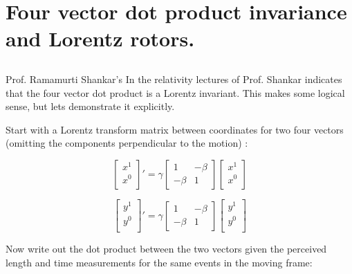 \chapter{Four vector dot product invariance and Lorentz rotors.}
\date{August 1, 2008}        %
\section{}

Prof. Ramamurti Shankar's 
In the relativity lectures of
\cite{ShankarPhy200} Prof. Shankar
indicates that the
four vector dot product
is a Lorentz invariant.  This makes some logical sense, but lets demonstrate it explicitly.

Start with a Lorentz transform matrix between coordinates for two four vectors (omitting the components perpendicular  to the motion) :

\begin{equation*}
{
\begin{bmatrix}
x^1 \\
x^0 \\
\end{bmatrix}
}'
=
\gamma
\begin{bmatrix}
1 & -\beta \\
-\beta & 1
\end{bmatrix}
\begin{bmatrix}
x^1 \\
x^0 \\
\end{bmatrix}
\end{equation*}

\begin{equation*}
{
\begin{bmatrix}
y^1 \\
y^0 \\
\end{bmatrix}
}'
=
\gamma
\begin{bmatrix}
1 & -\beta \\
-\beta & 1
\end{bmatrix}
\begin{bmatrix}
y^1 \\
y^0 \\
\end{bmatrix}
\end{equation*}

Now write out the dot product between the two vectors given the perceived length and time measurements for the same events in the moving frame:


